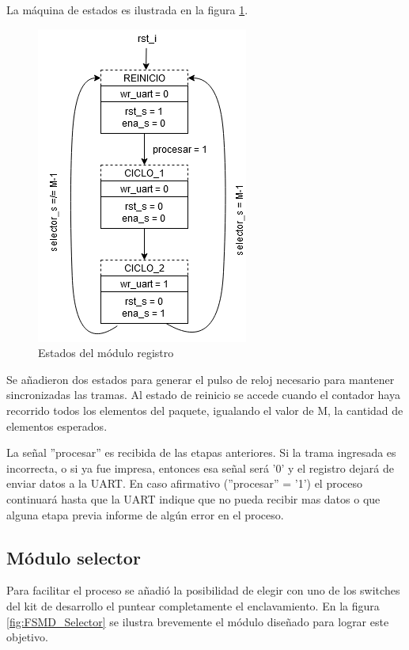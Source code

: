 		La máquina de estados es ilustrada en la figura \ref{fig:Estado_Registro}. 
		
		\begin{figure}[h]
		\centering
			\includegraphics[scale=.85]{./Figures/Estados-Registro}
			\caption{Estados del módulo registro}
			\label{fig:Estado_Registro}
		\end{figure}
		
		\vspace{10cm}	
		
		Se añadieron dos estados para generar el pulso de reloj necesario para mantener sincronizadas las tramas. Al estado de reinicio se accede cuando el contador haya recorrido todos los elementos del paquete, igualando el valor de M, la cantidad de elementos esperados. 
		
		La señal ''procesar'' es recibida de las etapas anteriores. Si la trama ingresada es incorrecta, o si ya fue impresa, entonces esa señal será '0' y el registro dejará de enviar datos a la UART. En caso afirmativo (''procesar'' = '1') el proceso continuará hasta que la UART indique que no pueda recibir mas datos o que alguna etapa previa informe de algún error en el proceso.
		
	\subsection{Módulo selector}
	
		Para facilitar el proceso se añadió la posibilidad de elegir con uno de los switches del kit de desarrollo el puntear completamente el enclavamiento. En la figura \ref{fig:FSMD_Selector} se ilustra brevemente el módulo diseñado para lograr este objetivo.
		
